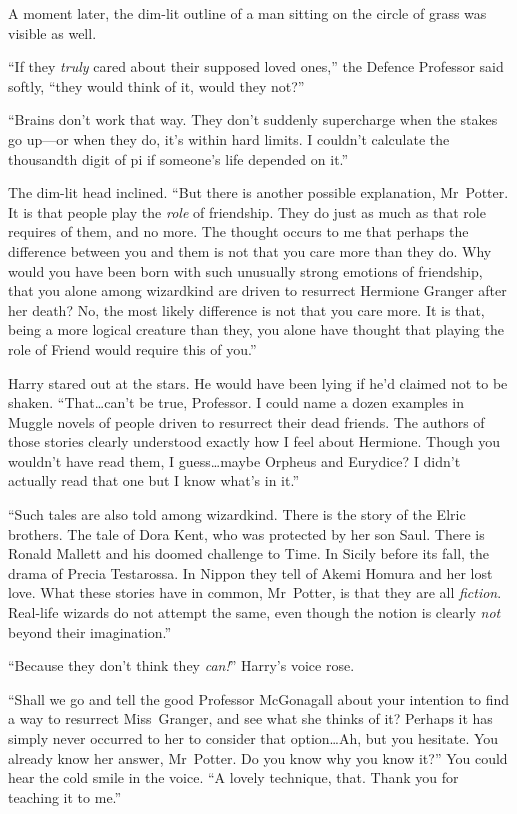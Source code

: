 A moment later, the dim-lit outline of a man sitting on the circle of grass was visible as well.

“If they \emph{truly} cared about their supposed loved ones,” the Defence Professor said softly, “they would think of it, would they not?”

“Brains don’t work that way. They don’t suddenly supercharge when the stakes go up—or when they do, it’s within hard limits. I couldn’t calculate the thousandth digit of pi if someone’s life depended on it.”

The dim-lit head inclined. “But there is another possible explanation, Mr~Potter. It is that people play the \emph{role} of friendship. They do just as much as that role requires of them, and no more. The thought occurs to me that perhaps the difference between you and them is not that you care more than they do. Why would you have been born with such unusually strong emotions of friendship, that you alone among wizardkind are driven to resurrect Hermione Granger after her death? No, the most likely difference is not that you care more. It is that, being a more logical creature than they, you alone have thought that playing the role of Friend would require this of you.”

Harry stared out at the stars. He would have been lying if he’d claimed not to be shaken. “That…can’t be true, Professor. I could name a dozen examples in Muggle novels of people driven to resurrect their dead friends. The authors of those stories clearly understood exactly how I feel about Hermione. Though you wouldn’t have read them, I guess…maybe Orpheus and Eurydice? I didn’t actually read that one but I know what’s in it.”

“Such tales are also told among wizardkind. There is the story of the Elric brothers. The tale of Dora Kent, who was protected by her son Saul. There is Ronald Mallett and his doomed challenge to Time. In Sicily before its fall, the drama of Precia Testarossa. In Nippon they tell of Akemi Homura and her lost love. What these stories have in common, Mr~Potter, is that they are all \emph{fiction}. Real-life wizards do not attempt the same, even though the notion is clearly \emph{not} beyond their imagination.”

“Because they don’t think they \emph{can!}” Harry’s voice rose.

“Shall we go and tell the good Professor McGonagall about your intention to find a way to resurrect Miss~Granger, and see what she thinks of it? Perhaps it has simply never occurred to her to consider that option…Ah, but you hesitate. You already know her answer, Mr~Potter. Do you know why you know it?” You could hear the cold smile in the voice. “A lovely technique, that. Thank you for teaching it to me.”

